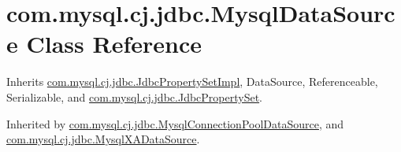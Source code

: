 \hypertarget{classcom_1_1mysql_1_1cj_1_1jdbc_1_1_mysql_data_source}{}\section{com.\+mysql.\+cj.\+jdbc.\+Mysql\+Data\+Source Class Reference}
\label{classcom_1_1mysql_1_1cj_1_1jdbc_1_1_mysql_data_source}


Inherits \mbox{\hyperlink{classcom_1_1mysql_1_1cj_1_1jdbc_1_1_jdbc_property_set_impl}{com.\+mysql.\+cj.\+jdbc.\+Jdbc\+Property\+Set\+Impl}}, Data\+Source, Referenceable, Serializable, and \mbox{\hyperlink{interfacecom_1_1mysql_1_1cj_1_1jdbc_1_1_jdbc_property_set}{com.\+mysql.\+cj.\+jdbc.\+Jdbc\+Property\+Set}}.



Inherited by \mbox{\hyperlink{classcom_1_1mysql_1_1cj_1_1jdbc_1_1_mysql_connection_pool_data_source}{com.\+mysql.\+cj.\+jdbc.\+Mysql\+Connection\+Pool\+Data\+Source}}, and \mbox{\hyperlink{classcom_1_1mysql_1_1cj_1_1jdbc_1_1_mysql_x_a_data_source}{com.\+mysql.\+cj.\+jdbc.\+Mysql\+X\+A\+Data\+Source}}.

